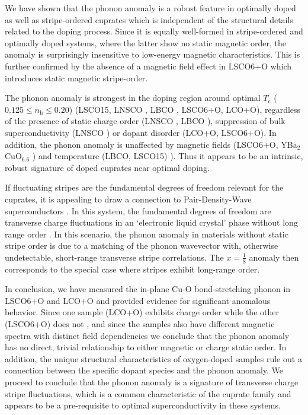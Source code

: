 We have shown that the phonon anomaly is a robust feature in optimally doped  as well as stripe-ordered cuprates which is independent of the structural details related to the doping process. Since it is equally well-formed in stripe-ordered and optimally doped systems, where the latter show no static magnetic order, the anomaly is surprisingly insensitive to low-energy magnetic characteristics. This is further confirmed by the absence of a magnetic field effect in LSCO6+O which introduces static magnetic stripe-order.

The phonon anomaly is strongest in the doping region around optimal $T_\text{c}$ ($0.125 \le n_\text{h} \le 0.20$) (LSCO15, LNSCO \cite{Reznik2007}, LBCO \cite{Reznik2006}, LSCO6+O, LCO+O), regardless of the presence of static charge order (LNSCO \cite{Tranquada1995}, LBCO \cite{Fujita2004}), suppression of bulk superconductivity (LNSCO \cite{Tranquada1996}) or dopant disorder (LCO+O, LSCO6+O). In addition, the phonon anomaly is unaffected by magnetic fields (LSCO6+O, YBa$_2$CuO$_{6.6}$ \cite{Reznik2016}) and temperature (LBCO, LSCO15) \cite{Reznik2007}). Thus it appears to be an intrinsic, robust signature of doped cuprates near optimal doping.

If fluctuating stripes are the fundamental degrees of freedom relevant for the cuprates, it is appealing to draw a connection to Pair-Density-Wave superconductors \cite{Fradkin2015}. In this system, the fundamental degrees of freedom are transverse charge fluctuations in an `electronic liquid crystal' phase without long range order \cite{Kivelson1998}. In this scenario, the phonon anomaly in materials without static stripe order is due to a matching of the phonon wavevector with, otherwise undetectable, short-range transverse stripe correlations. The $x=\frac{1}{8}$ anomaly then corresponds to the special case where stripes exhibit long-range order. 

In conclusion, we have measured the in-plane Cu-O bond-stretching phonon in LSCO6+O and LCO+O and provided evidence for significant anomalous behavior. Since one sample (LCO+O) exhibits charge order \cite{Zhang2018} while the other (LSCO6+O) does not \cite{Holm2019}, and since the samples also have different magnetic spectra with distinct field dependencies \cite{Jacobsen2018, Holm2019} we conclude that the phonon anomaly has no direct, trivial relationship to either magnetic or charge static order. In addition, the unique structural characteristics of oxygen-doped samples rule out a connection between the specific dopant species and the phonon anomaly. We proceed to conclude that the phonon anomaly is a signature of transverse charge stripe fluctuations, which is a common characteristic of the cuprate family and appears to be a pre-requisite to optimal superconductivity in these systems.

